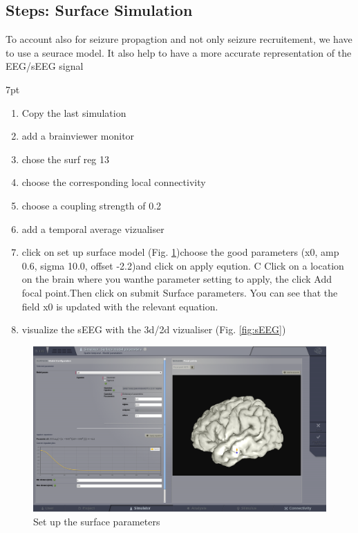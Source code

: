 \documentclass{tufte-handout}
\newenvironment{simulation}{%
  \def\FrameCommand{%
    \hspace{1pt}%
    {\color{ForestGreen}\vrule width 2pt}%
    {\color{simulationshade}\vrule width 4pt}%
    \colorbox{simulationshade}%
  }%
  \MakeFramed{\advance\hsize-\width\FrameRestore}%
  \noindent\hspace{-4.55pt}%
  \begin{adjustwidth}{}{7pt}%
  \vspace{2pt}\vspace{2pt}%
}
{%
  \vspace{2pt}\end{adjustwidth}\endMakeFramed%
}
\begin{document}
\subsection{Steps: Surface Simulation}

 To account also for seizure propagtion and not only seizure recruitement, we have to use a seurace model. 
 It also help to have a more accurate representation of the EEG/sEEG signal
  \begin{simulation}
  \begin{enumerate}
  \item Copy the last simulation
  \item add a brainviewer monitor
  \item chose the surf reg 13
  \item choose the corresponding local connectivity
  \item choose  a coupling strength of 0.2
  \item add a temporal average vizualiser
  \item click on set up surface model (Fig. \ref{fig:set_up_surface_parameters})choose the good parameters (x0, amp 0.6, sigma 10.0, offset -2.2)and click on apply eqution. C	Click on a location on the brain where you wanthe parameter setting to apply, the click Add focal point.Then click on submit Surface parameters. You can see that the field x0 is updated with the relevant equation.
  \item visualize the sEEG with the 3d/2d vizualiser (Fig. \ref{fig:sEEG})
\end{enumerate}
\end{simulation}

\begin{figure}[h]
  \includegraphics[width=\linewidth]{Handout_UI_ModellingAnEpilepticPatient_SetUpSurfaceParameters}%
  \caption{Set up the surface parameters}%
  \label{fig:set_up_surface_parameters}%
\end{figure}
\end{document}
